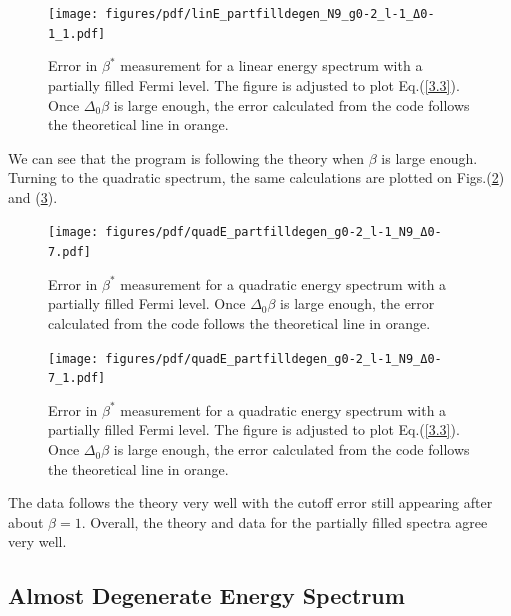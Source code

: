 \begin{figure}[H]
    \centering
    \texttt{[image: figures/pdf/linE\_partfilldegen\_N9\_g0-2\_l-1\_Δ0-1\_1.pdf]}
    \caption{Error in $\beta^*$ measurement for a linear energy spectrum with a partially filled Fermi level. The figure is adjusted to plot Eq.\@ (\ref{3.3}). Once $\Delta_0\beta$ is large enough, the error calculated from the code follows the theoretical line in orange.}
    \label{fig:PartiallyFilledDegenerateLinearSpectrumAdjustedError}
\end{figure}
We can see that the program is following the theory when $\beta$ is large enough. Turning to the quadratic spectrum, the same calculations are plotted on Figs.\@ (\ref{fig:PartiallyFilledDegenerateQuadraticSpectrumError}) and (\ref{fig:PartiallyFilledDegenerateQuadraticSpectrumAdjustedError}). 

\begin{figure}[H]
    \centering
    \texttt{[image: figures/pdf/quadE\_partfilldegen\_g0-2\_l-1\_N9\_Δ0-7.pdf]}
    \caption{Error in $\beta^*$ measurement for a quadratic energy spectrum with a partially filled Fermi level. Once $\Delta_0\beta$ is large enough, the error calculated from the code follows the theoretical line in orange.}
    \label{fig:PartiallyFilledDegenerateQuadraticSpectrumError}
\end{figure}

\begin{figure}[H]
    \centering
    \texttt{[image: figures/pdf/quadE\_partfilldegen\_g0-2\_l-1\_N9\_Δ0-7\_1.pdf]}
    \caption{Error in $\beta^*$ measurement for a quadratic energy spectrum with a partially filled Fermi level. The figure is adjusted to plot Eq.\@ (\ref{3.3}). Once $\Delta_0\beta$ is large enough, the error calculated from the code follows the theoretical line in orange.}
    \label{fig:PartiallyFilledDegenerateQuadraticSpectrumAdjustedError}
\end{figure}

The data follows the theory very well with the cutoff error still appearing after about $\beta=1$. Overall, the theory and data for the partially filled spectra agree very well. 
\subsection{Almost Degenerate Energy Spectrum}

